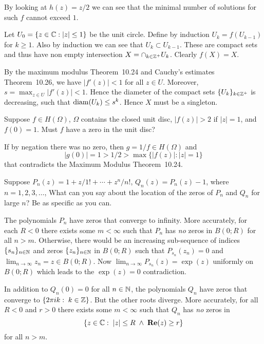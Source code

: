 \begin{enumerate}
By looking at \(h(z) = z/2\) we can see that the minimal number of
solutions for such $f$ cannot exceed $1$.

Let \(U_0 = \{z\in\mathbb{C}: |z|\leq 1\}\) be the unit circle.
Define by induction \(U_k = f(U_{k-1})\) for \(k\geq 1\).
Also by induction we can see that \(U_k \subset U_{k-1}\).
These are compact sets and thus have non empty intersection
\(X = \cap_{k\in\mathbb{Z}^+} U_k\). Clearly \(f(X) = X\).

By the maximum modulus Theorem~10.24
and Cauchy's estimates Theorem~10.26, we have \(|f'(z)|<1\) for all \(z\in U\).
Moreover, \(s = \max_{z\in U}|f'(z)|<1\).
Hence the diameter of the compact sets \(\{U_k\}_{k\in\mathbb{Z}^+}\) is decreasing,
such that \(\mathop{\rm diam}\nolimits(U_k) \leq s^k\). Hence $X$ must be a singleton.

\begin{excopy}
Suppose \(f\in H(\Omega)\), \(\Omega\) contains the closed unit disc,
\(|f(z)| > 2\) if \(|z|=1\), and \(f(0)=1\).
Must $f$ have a zero in the unit disc?
\end{excopy}

If by negation there was no zero, then \(g = 1/f \in H(\Omega)\)
and 
\begin{equation*}
|g(0)| = 1 > 1/2 > \max\{|f(z)|: |z|=1\}
\end{equation*}
that contradicts the
Maximum Modulus Theorem~10.24.

\begin{excopy}
Suppose \(P_n(z) = 1 + z/1! + \cdots + z^n/n!\),
\(Q_n(z) = P_n(z) - 1\), where \(n=1,2,3,\ldots\),
What can you say about the location of the zeros
of \(P_n\) and \(Q_n\) for large $n$?
Be as specific as you can.
\end{excopy}

The polynomials \(P_n\) have zeros that converge to infinity.
More accurately, for each \(R<0\) there exists some \(m<\infty\)
such that \(P_n\) has \emph{no} zeros in \(B(0;R)\) for all \(n>m\).
Otherwise, there would be an increasing sub-sequence of indices 
\(\{s_n\}_{n\in\mathbb{N}}\) and zeros \(\{z_n\}_{n\in\mathbb{N}}\) in \(B(0;R)\) 
such that \(P_{s_n}(z_n) = 0\) and \(\lim_{n\to\infty} z_n = z\in B(0;R)\).
Now \(\lim_{n\to\infty} P_{s_n}(z) = \exp(z)\) uniformly on \(B(0;R)\)
which leads to the \(\exp(z) = 0\) contradiction.

In addition to \(Q_n(0)=0\) for all \(n\in\mathbb{N}\),
the polynomials \(Q_n\) have zeros that converge to \(\{2\pi i k: \;k\in\mathbb{Z}\}\).
But the other roots diverge. More accurately,
for all \(R<0\) and \(r>0\)  there exists some \(m<\infty\)
such that \(Q_n\) has \emph{no} zeros in
\begin{equation*}
\{z\in\mathbb{C}:\; |z|\leq R \;\wedge\; \mathop{\bf Re}\nolimits(z)\geq r\}
\end{equation*}
for all \(n>m\).



\end{enumerate}
